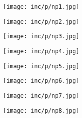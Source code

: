 \noindent
\texttt{[image: inc/p/np1.jpg]}

\newpage

\noindent
\texttt{[image: inc/p/np2.jpg]}

\newpage

\noindent
\texttt{[image: inc/p/np3.jpg]}

\newpage

\noindent
\texttt{[image: inc/p/np4.jpg]}

\newpage

\noindent
\texttt{[image: inc/p/np5.jpg]}

\newpage

\noindent
\texttt{[image: inc/p/np6.jpg]}

\newpage

\noindent
\texttt{[image: inc/p/np7.jpg]}

\newpage

\noindent
\texttt{[image: inc/p/np8.jpg]}

\newpage